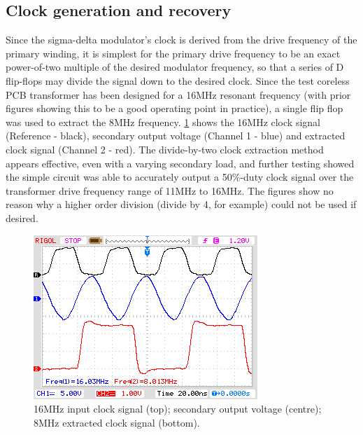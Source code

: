 \documentclass[conference]{IEEEtran}
\begin{document}
	\subsection{Clock generation and recovery}
	Since the sigma-delta modulator's clock is derived from the drive frequency of the primary winding, it is simplest for the primary drive frequency to be an exact power-of-two multiple of the desired modulator frequency, so that a series of D flip-flops may divide the signal down to the desired clock.  Since the test coreless PCB transformer has been designed for a 16MHz resonant frequency (with prior figures showing this to be a good operating point in practice), a single flip flop was used to extract the 8MHz frequency.  \ref{fig:Clock} shows the 16MHz clock signal (Reference - black), secondary output voltage (Channel 1 - blue) and extracted clock signal (Channel 2 - red).  The divide-by-two clock extraction method appears effective, even with a varying secondary load, and further testing showed the simple circuit was able to accurately output a 50\%-duty clock signal over the transformer drive frequency range of 11MHz to 16MHz.  The figures show no reason why a higher order division (divide by 4, for example) could not be used if desired.
	
	\begin{figure}[t]
		\centering
		\includegraphics[width=0.8\columnwidth]{./img/Clock}
		\caption{16MHz input clock signal (top); secondary output voltage (centre); 8MHz extracted clock signal (bottom).}
		\label{fig:Clock}
	\end{figure}
	
\end{document}
